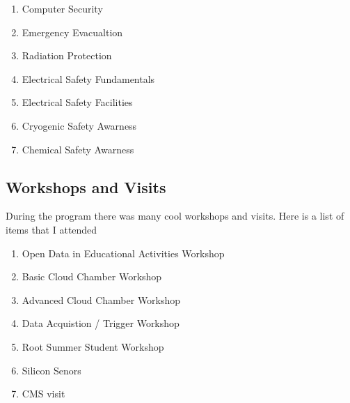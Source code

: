 \documentclass[12pt,a4paper]{article}
\begin{document}
\begin{enumerate}
\item Computer Security
\item Emergency Evacualtion
\item Radiation Protection
\item Electrical Safety Fundamentals
\item Electrical Safety Facilities
\item Cryogenic Safety Awarness
\item Chemical Safety Awarness
\end{enumerate}

\subsection{Workshops and Visits}
During the program there was many cool workshops and visits. Here is a list of items that I attended

\begin{enumerate}

\item Open Data in Educational Activities Workshop
\item Basic Cloud Chamber Workshop
\item Advanced Cloud Chamber Workshop
\item Data Acquistion / Trigger Workshop
\item Root Summer Student Workshop
\item Silicon Senors
\item CMS visit
\end{enumerate} 
\end{document}
